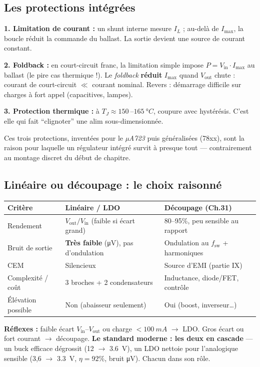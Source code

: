 \documentclass[12pt,a4paper,twoside]{book}
\begin{document}
\subsection{Les protections intégrées}

\begin{formule}
\textbf{1. Limitation de courant :} un shunt interne mesure $I_L$ ; au-delà de $I_{\max}$, la boucle réduit la commande du ballast. La sortie devient une source de courant constant.

\textbf{2. Foldback :} en court-circuit franc, la limitation simple impose $P = V_{\text{in}}\cdot I_{\max}$ au ballast (le pire cas thermique !). Le \textit{foldback} \textbf{réduit} $I_{\max}$ quand $V_{\text{out}}$ chute : courant de court-circuit $\ll$ courant nominal. Revers : démarrage difficile sur charges à fort appel (capacitives, lampes).

\textbf{3. Protection thermique :} à $T_J \approx \SI{150}{}$--$\SI{165}{°C}$, coupure avec hystérésis. C'est elle qui fait ``clignoter'' une alim sous-dimensionnée.

Ces trois protections, inventées pour le \textit{µA723} puis généralisées (78xx), sont la raison pour laquelle un régulateur intégré survit à presque tout --- contrairement au montage discret du début de chapitre.
\end{formule}

\subsection{Linéaire ou découpage : le choix raisonné}

\begin{pratique}
\begin{center}
\renewcommand{\arraystretch}{1.4}
\begin{tabular}{p{3.2cm}p{4.4cm}p{4.6cm}}
\toprule
\textbf{Critère} & \textbf{Linéaire / LDO} & \textbf{Découpage (Ch.31)} \\
\midrule
Rendement & $V_{\text{out}}/V_{\text{in}}$ (faible si écart grand) & 80--95\%, peu sensible au rapport \\
Bruit de sortie & \textbf{Très faible} (\si{\micro V}), pas d'ondulation & Ondulation au $f_{\text{sw}}$ + harmoniques \\
CEM & Silencieux & Source d'EMI (partie IX) \\
Complexité / coût & 3 broches + 2 condensateurs & Inductance, diode/FET, contrôle \\
Élévation possible & Non (abaisseur seulement) & Oui (boost, inverseur\ldots) \\
\bottomrule
\end{tabular}
\end{center}

\textbf{Réflexes :} faible écart $V_{\text{in}}$--$V_{\text{out}}$ ou charge $< \SI{100}{mA}$ $\to$ LDO. Gros écart ou fort courant $\to$ découpage. \textbf{Le standard moderne : les deux en cascade} --- un buck efficace dégrossit (12 $\to$ \SI{3.6}{V}), un LDO nettoie pour l'analogique sensible (3,6 $\to$ \SI{3.3}{V}, $\eta = 92\%$, bruit \si{\micro V}). Chacun dans son rôle.
\end{pratique}
\end{document}
